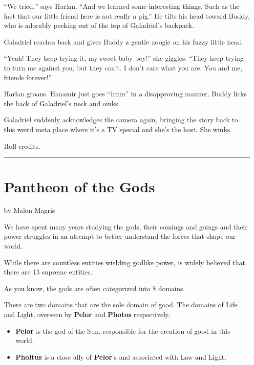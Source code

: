\documentclass[smalldemyvopaper,11pt,twoside,onecolumn,openright,extrafontsizes]{memoir}
\begin{document}
``We tried,'' says Harlan. ``And we learned some interesting things.
Such as the fact that our little friend here is not really a pig.'' He
tilts his head toward Buddy, who is adorably peeking out of the top of
Galadriel's backpack.

Galadriel reaches back and gives Buddy a gentle noogie on his fuzzy
little head.

``Yeah! They keep trying it, my sweet baby boy!'' she giggles. ``They
keep trying to turn me against you, but they can't. I don't care what
you are. You and me, friends forever!''

Harlan groans. Hanamir just goes ``hmm'' in a disapproving manner. Buddy
licks the back of Galadriel's neck and oinks.

Galadriel suddenly acknowledges the camera again, bringing the story
back to this weird meta place where it's a TV special and she's the
host. She winks.

Roll credits.

\begin{center}\rule{0.5\linewidth}{\linethickness}\end{center}

\hypertarget{pantheon-of-the-gods}{%
\section{Pantheon of the Gods}\label{pantheon-of-the-gods}}

by Malon Magris

We have spent many years studying the gods, their comings and goings and
their power struggles in an attempt to better understand the forces that
shape our world.

While there are countless entities wielding godlike power, is widely
believed that there are 13 supreme entities.

As you know, the gods are often categorized into 8 domains.

There are two domains that are the sole domain of good. The domains of
Life and Light, overseen by \textbf{Pelor} and \textbf{Photos}
respectively.

\begin{itemize}
\tightlist
\item
  \textbf{Pelor} is the god of the Sun, responsible for the creation of
  good in this world.
\item
  \textbf{Pholtus} is a close ally of \textbf{Pelor}'s and associated
  with Law and Light.
\end{itemize}
\end{document}
